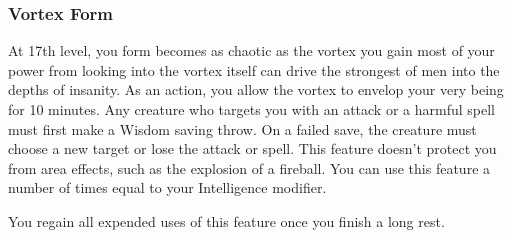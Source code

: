 \subsubsection{Vortex Form}

At 17th level, you form becomes as chaotic as the vortex you gain most of your power from looking into the vortex itself can drive the strongest of men into the depths of insanity. As an action, you allow the vortex to envelop your very being for 10 minutes. Any creature who targets you with an attack or a harmful spell must first make a Wisdom saving throw. On a failed save, the creature must choose a new target or lose the attack or spell. This feature doesn’t protect you from area effects, such as the explosion of a fireball. You can use this feature a number of times equal to your Intelligence modifier.

You regain all expended uses of this feature once you finish a long rest.

